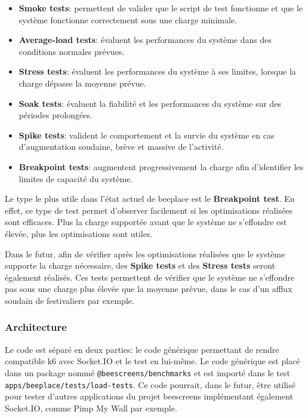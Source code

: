 \begin{itemize}
  \item \textbf{Smoke tests}: permettent de valider que le script de test fonctionne et que le système fonctionne correctement sous une charge minimale.
  \item \textbf{Average-load tests}: évaluent les performances du système dans des conditions normales prévues.
  \item \textbf{Stress tests}: évaluent les performances du système à ses limites, lorsque la charge dépasse la moyenne prévue.
  \item \textbf{Soak tests}: évaluent la fiabilité et les performances du système sur des périodes prolongées.
  \item  \textbf{Spike tests}: valident le comportement et la survie du système en cas d'augmentation soudaine, brève et massive de l'activité.
  \item \textbf{Breakpoint tests}: augmentent progressivement la charge afin d'identifier les limites de capacité du système.
\end{itemize}

Le type le plus utile dans l'état actuel de \gls{beeplace} est le \textbf{Breakpoint test}. En effet, ce type de test permet d'observer facilement si les optimisations réalisées sont efficaces. Plus la charge supportée avant que le système ne s'effondre est élevée, plus les optimisations sont utiles.

Dans le futur, afin de vérifier après les optimisations réalisées que le système supporte la charge nécessaire, des \textbf{Spike tests} et des \textbf{Stress tests} seront également réalisés. Ces tests permettent de vérifier que le système ne s'effondre pas sous une charge plus élevée que la moyenne prévue, dans le cas d'un afflux soudain de festivaliers par exemple.

\subsubsection{Architecture}

Le code est séparé en deux parties: le code générique permettant de rendre compatible k6 avec Socket.IO et le test en lui-même. Le code générique est placé dans un package nommé \texttt{@beescreens/benchmarks} et est importé dans le test \texttt{apps/beeplace/tests/load-tests}. Ce code pourrait, dans le futur, être utilisé pour tester d'autres applications du projet \gls{beescreens} implémentant également Socket.IO, comme Pimp My Wall par exemple.

